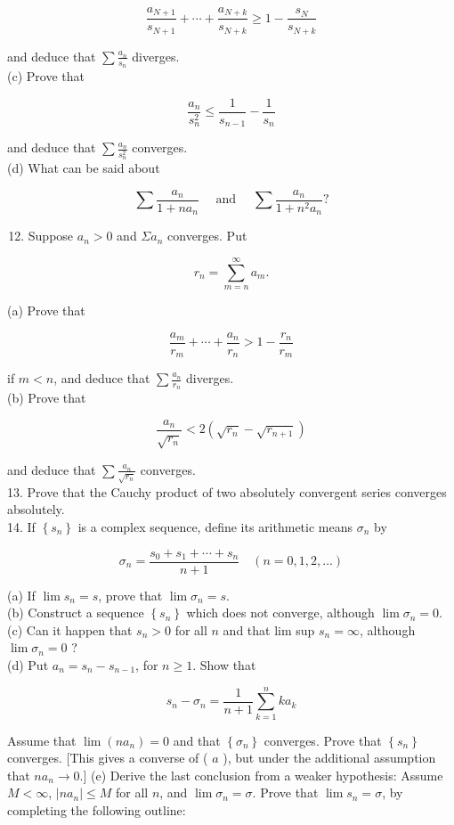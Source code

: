 \documentclass[10pt]{article}
\begin{document}
$$
\frac{a_{N+1}}{s_{N+1}}+\cdots+\frac{a_{N+k}}{s_{N+k}} \geq 1-\frac{s_{N}}{s_{N+k}}
$$

and deduce that $\sum \frac{a_{n}}{s_{n}}$ diverges.\\
(c) Prove that

$$
\frac{a_{n}}{s_{n}^{2}} \leq \frac{1}{s_{n-1}}-\frac{1}{s_{n}}
$$

and deduce that $\sum \frac{a_{n}}{s_{n}^{2}}$ converges.\\
(d) What can be said about

$$
\sum \frac{a_{n}}{1+n a_{n}} \quad \text { and } \quad \sum \frac{a_{n}}{1+n^{2} a_{n}} ?
$$

\begin{enumerate}
  \setcounter{enumi}{11}
  \item Suppose $a_{n}>0$ and $\Sigma a_{n}$ converges. Put
\end{enumerate}

$$
r_{n}=\sum_{m=n}^{\infty} a_{m} .
$$

(a) Prove that

$$
\frac{a_{m}}{r_{m}}+\cdots+\frac{a_{n}}{r_{n}}>1-\frac{r_{n}}{r_{m}}
$$

if $m<n$, and deduce that $\sum \frac{a_{n}}{r_{n}}$ diverges.\\
(b) Prove that

$$
\frac{a_{n}}{\sqrt{r_{n}}}<2\left(\sqrt{r_{n}}-\sqrt{r_{n+1}}\right)
$$

and deduce that $\sum \frac{a_{n}}{\sqrt{r_{n}}}$ converges.\\
13. Prove that the Cauchy product of two absolutely convergent series converges absolutely.\\
14. If $\left\{s_{n}\right\}$ is a complex sequence, define its arithmetic means $\sigma_{n}$ by

$$
\sigma_{n}=\frac{s_{0}+s_{1}+\cdots+s_{n}}{n+1} \quad(n=0,1,2, \ldots)
$$

(a) If $\lim s_{n}=s$, prove that $\lim \sigma_{n}=s$.\\
(b) Construct a sequence $\left\{s_{n}\right\}$ which does not converge, although $\lim \sigma_{n}=0$.\\
(c) Can it happen that $s_{n}>0$ for all $n$ and that lim sup $s_{n}=\infty$, although $\lim \sigma_{n}=0$ ?\\
(d) Put $a_{n}=s_{n}-s_{n-1}$, for $n \geq 1$. Show that

$$
s_{n}-\sigma_{n}=\frac{1}{n+1} \sum_{k=1}^{n} k a_{k}
$$

Assume that $\lim \left(n a_{n}\right)=0$ and that $\left\{\sigma_{n}\right\}$ converges. Prove that $\left\{s_{n}\right\}$ converges. [This gives a converse of ( $a$ ), but under the additional assumption that $n a_{n} \rightarrow 0$.] (e) Derive the last conclusion from a weaker hypothesis: Assume $M<\infty$, $\left|n a_{n}\right| \leq M$ for all $n$, and $\lim \sigma_{n}=\sigma$. Prove that $\lim s_{n}=\sigma$, by completing the following outline:
\end{document}

